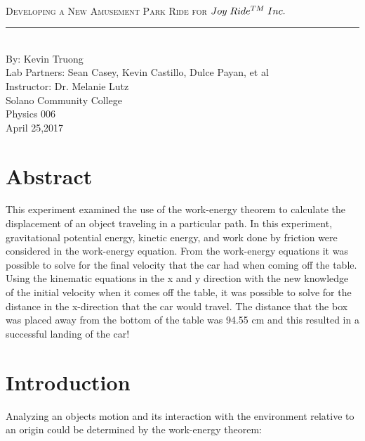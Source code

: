 \documentclass[aps,letterpaper,11pt]{revtex4}
\newcommand{\labno}{9}
\newcommand{\labtitle}{Developing a New Amusement Park Ride for $Joy \hspace{1mm} Ride^{TM} \hspace{1mm} Inc.$}
\newcommand{\authorname}{Kevin Truong}
\newcommand{\professor}{Dr. Melanie Lutz}
\newcommand{\classno}{Physics 006}
\newcommand{\labpartners}{Sean Casey, Kevin Castillo, Dulce Payan, et al}
\newcommand{\submitdate}{April 25,2017}
\begin{document}
\begin{titlepage}
\begin{center}
\hspace{-136mm}\boxed{{\Large \textsc{Lab No. \labno}}}\\\vspace{30mm}
{\Large \textsc{\labtitle} \\ \vspace{4pt}}
\rule[13pt]{\textwidth}{1pt}\\ \vspace{150pt}
{\large By: \authorname \\ \vspace{10pt}}
Lab Partners: \labpartners \\
Instructor: \professor \vspace{10pt} \\
Solano Community College\\ \classno \\ \vspace{10pt}
\submitdate
\end{center}
\end{titlepage}

\section{Abstract}

This experiment examined the use of the work-energy theorem to calculate the displacement of an object traveling in a particular path. In this experiment, gravitational potential energy, kinetic energy, and work done by friction were considered in the work-energy equation. From the work-energy equations it was possible to solve for the final velocity that the car had when coming off the table. Using the kinematic equations in the x and y direction with the new knowledge of the initial velocity when it comes off the table, it was possible to solve for the distance in the x-direction that the car would travel. The distance that the box was placed away from the bottom of the table was 94.55 cm and this resulted in a successful landing of the car! 

\section{Introduction}

Analyzing an objects motion and its interaction with the environment relative to an origin could be determined by the work-energy theorem:
\end{document}
